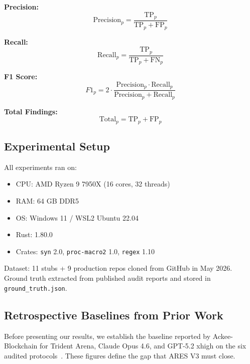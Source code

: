 \documentclass{article}
\begin{document}
\textbf{Precision:}
\begin{equation}
  \text{Precision}_p = \frac{\text{TP}_p}{\text{TP}_p + \text{FP}_p}
  \label{eq:precision}
\end{equation}

\textbf{Recall:}
\begin{equation}
  \text{Recall}_p = \frac{\text{TP}_p}{\text{TP}_p + \text{FN}_p}
  \label{eq:recall}
\end{equation}

\textbf{F1 Score:}
\begin{equation}
  F1_p = 2 \cdot \frac{\text{Precision}_p \cdot \text{Recall}_p}{\text{Precision}_p + \text{Recall}_p}
  \label{eq:f1}
\end{equation}

\textbf{Total Findings:}
\begin{equation}
  \text{Total}_p = \text{TP}_p + \text{FP}_p
  \label{eq:total}
\end{equation}

\subsection{Experimental Setup}

All experiments ran on:
\begin{itemize}
  \item CPU: AMD Ryzen 9 7950X (16 cores, 32 threads)
  \item RAM: 64 GB DDR5
  \item OS: Windows 11 / WSL2 Ubuntu 22.04
  \item Rust: 1.80.0
  \item Crates: \texttt{syn} 2.0, \texttt{proc-macro2} 1.0, \texttt{regex} 1.10
\end{itemize}

Dataset: 11 stubs + 9 production repos cloned from GitHub in May 2026. Ground truth extracted from published audit reports and stored in \texttt{ground\_truth.json}.

\subsection{Retrospective Baselines from Prior Work}

Before presenting our results, we establish the baseline reported by Ackee-Blockchain for Trident Arena, Claude Opus 4.6, and GPT-5.2 xhigh on the six audited protocols~\citep{ackee2026trident_arena}. These figures define the gap that ARES V3 must close.
\end{document}
